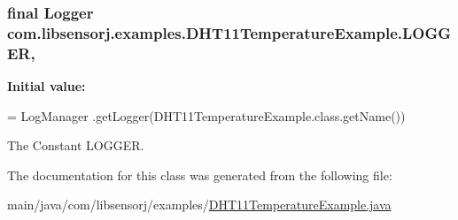 \subsubsection[{L\+O\+G\+G\+E\+R}]{\setlength{\rightskip}{0pt plus 5cm}final Logger com.\+libsensorj.\+examples.\+D\+H\+T11\+Temperature\+Example.\+L\+O\+G\+G\+E\+R\hspace{0.3cm}{\ttfamily [static]}, {\ttfamily [private]}}\label{classcom_1_1libsensorj_1_1examples_1_1DHT11TemperatureExample_aeff63d1b9c193a87d39c045346483fb2}
{\bfseries Initial value\+:}
\begin{DoxyCode}
= LogManager
            .getLogger(DHT11TemperatureExample.class.getName())
\end{DoxyCode}
The Constant L\+O\+G\+G\+E\+R. 

The documentation for this class was generated from the following file\+:\begin{DoxyCompactItemize}
\item 
main/java/com/libsensorj/examples/\hyperlink{DHT11TemperatureExample_8java}{D\+H\+T11\+Temperature\+Example.\+java}\end{DoxyCompactItemize}
